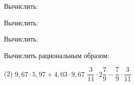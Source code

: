 \begin{homework}[number=1]
	\begin{listofex}
	\item Вычислить:
	\begin{itasks}[2]
		\task {}
		\task {}
	\end{itasks}
	\item Вычислить:
	\begin{itasks}[2]
		\task {}
		\task {}
	\end{itasks}
	\item Вычислить:
	\begin{itasks}[1]
		\task {}
		\task {}
		\task {}
	\end{itasks}
	\item Вычислить рациональным образом:
	\begin{tasks}(2)
		\task \( 9,67\cdot5,97+4,03\cdot9,67 \)
		\task \( \dfrac{3}{11}\cdot2\dfrac{7}{9}-\dfrac{7}{9}\cdot\dfrac{3}{11} \)
	\end{tasks}
	\item {}
	\end{listofex}
\end{homework}

